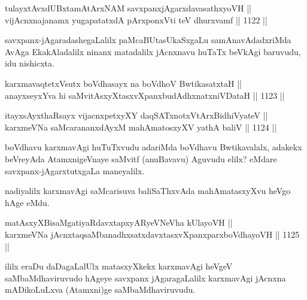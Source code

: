 \begin{shl}
tulayxtAvxdUBxtamAtArxNAM savxpanxjAgarxdavasathxyoVH || \\
vijAcnxnajanamx yugapatatxdA pArxponxVti teV dhurxvamf \hfill || 1122 ||  
\end{shl}

\begin{artha}
savxpanx-jAgaradashegaLalilx paMcaBUtasUkaSxgaLu samAnavAdadxriMda 
AvAga EkakAladalilx ninanx matadalilx jAcnxnavu huTaTx beVkAgi baruvudu, idu nishicxta.
\end{artha}


\begin{shl}
karxmavaqtetxVsutx boVdhasayx na boVdhoV BwtikasatxtaH || \\
anayxseyxYva hi saMvitAsxyXtasxvXpanxbudAdhxnatxniVDataH \hfill || 1123 || 
\end{shl}
				
\begin{shl}
itayxsAyxthaRsayx vijacnxpetxyXY daqSATxnotxV\s tArxBidhiVyateV ||  \\
karxmeVNa saMcarananxdAyxM mahAmatosxyXV yathA baliV \hfill || 1124 ||  
\end{shl}

\begin{artha}
boVdhavu karxmavAgi huTuTxvudu adariMda boVdhavu Bwtikavalalx, adakekx beVreyAda AtamxnigeVnaye saMvitf (anuBavavu) Aguvudu elilx? eMdare savxpanx-jAgarxtutxgaLa maneyalilx.
\end{artha}


\begin{artha}
nadiyalilx karxmavAgi saMcarisuva baliSaThxvAda mahAmatasxyXvu heVgo hAge eMdu.
\end{artha}

\begin{shl}
matAsxyXBisaMgatiyaRdavxtapxyARyeVNeVha kUlayoVH || \\
karxmeVNa jAcnxtaqsaMbanadhxsatxdavxtasxvXpanxparxboVdhayoVH \hfill || 1125 ||  
\end{shl}

\begin{artha}
ililx eraDu daDagaLalUlx matasxyXkekx karxmavAgi heVgeV saMbaMdhaviruvudo hAgeye savxpanx jAgaragaLalilx karxmavAgi jAcnxna mADikoLuLxva (Atamxni)ge saMbaMdhaviruvudu.
\end{artha}

